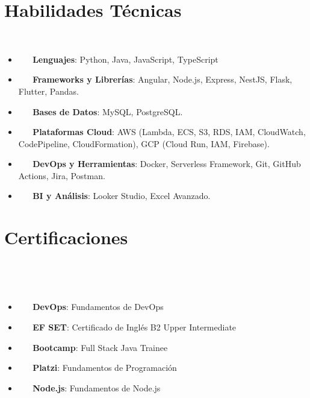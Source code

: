\documentclass[letterpaper,11pt]{article}
\newcommand{\resumeItem}[2]{
  \item\small{
    \textbf{#1}{#2 \vspace{-2pt}}
  }
}
\newcommand{\resumeSubItem}[2]{\resumeItem{#1}{#2}\vspace{-4pt}}
\newcommand{\resumeSubItemcol}[2]{\resumeItem{#1}{#2}\vspace{-8pt}}
\newcommand{\resumeSubHeadingListStart}{\begin{itemize}[leftmargin=*]}
\newcommand{\resumeSubHeadingListEnd}{\end{itemize}}
\begin{document}
\section{Habilidades Técnicas}
 \resumeSubHeadingListStart
 \resumeSubItem{}{\textbf{Lenguajes}{: Python, Java, JavaScript, TypeScript}}
 \resumeSubItem{}{\textbf{Frameworks y Librerías}{: Angular, Node.js, Express, NestJS, Flask, Flutter, Pandas.}}
 \resumeSubItem{}{\textbf{Bases de Datos}{: MySQL, PostgreSQL.}}
 \resumeSubItem{}{\textbf{Plataformas Cloud}{: AWS (Lambda, ECS, S3, RDS, IAM, CloudWatch, CodePipeline, CloudFormation), GCP (Cloud Run, IAM, Firebase).}}
 \resumeSubItem{}{\textbf{DevOps y Herramientas}{: Docker, Serverless Framework, Git, GitHub Actions, Jira, Postman.}}
 \resumeSubItem{}{\textbf{BI y Análisis}{: Looker Studio, Excel Avanzado.}}
 \resumeSubHeadingListEnd

\section{Certificaciones}
\vspace{-15pt}
  \begin{multicols}{2}
    \resumeSubHeadingListStart
    \resumeSubItemcol{DevOps}{: Fundamentos de DevOps}
    \resumeSubItemcol{EF SET}{: Certificado de Inglés B2 Upper Intermediate}
    \resumeSubItemcol{Bootcamp}{: Full Stack Java Trainee}
    \resumeSubItemcol{Platzi}{: Fundamentos de Programación}
    \resumeSubItemcol{Node.js}{: Fundamentos de Node.js}
  \resumeSubHeadingListEnd
  \end{multicols}
\end{document}
